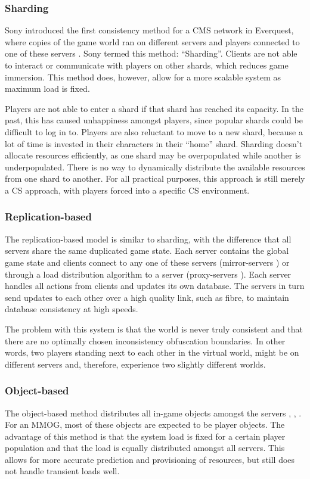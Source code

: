 \documentclass[10pt,a4paper,journal,cspaper,compsoc]{IEEEtran}
\begin{document}
\subsubsection{Sharding}
Sony introduced the first consistency method for a \ac{CMS} network in Everquest, where copies of the game world ran on different servers and players
connected to one of these servers \cite{engineering_everquest}. Sony termed this method: ``Sharding''. Clients are not able to interact or
communicate with players on other shards, which reduces game immersion. This method does, however, allow for a more scalable system as maximum load
is fixed.

Players are not able to enter a shard if that shard has reached its capacity. In the past, this has caused unhappiness amongst players, since popular
shards could be difficult to log in to. Players are also reluctant to move to a new shard, because a lot of time is invested in their characters in
their ``home'' shard. Sharding doesn't allocate resources efficiently, as one shard may be overpopulated while another is underpopulated. There is no
way to dynamically distribute the available resources from one shard to another. For all practical purposes, this approach is still merely a \ac{CS}
approach, with players forced into a specific \ac{CS} environment.

\subsubsection{Replication-based}
The replication-based model is similar to sharding, with the difference that all servers share the same duplicated game state. Each server contains
the global game state and clients connect to any one of these servers (mirror-servers \cite{mirrored_server}) or through a load distribution
algorithm to a server (proxy-servers \cite{proxy_server_dist}). Each server handles all actions from clients and updates its own database. The
servers in turn send updates to each other over a high quality link, such as fibre, to maintain database consistency at high speeds.

The problem with this system is that the world is never truly consistent and that there are no optimally chosen inconsistency obfuscation boundaries.
In other words, two players standing next to each other in the virtual world, might be on different servers and, therefore, experience two slightly
different worlds.

\subsubsection{Object-based}
The object-based method distributes all in-game objects amongst the servers \cite{object_based_consistency1}, \cite{object_based_consistency2},
\cite{object_based_consistency3}. For an MMOG, most of these objects are expected to be player objects. The advantage of this method is that the
system load is fixed for a certain player population and that the load is equally distributed amongst all servers. This allows for more accurate
prediction and provisioning of resources, but still does not handle transient loads well.
\end{document}
